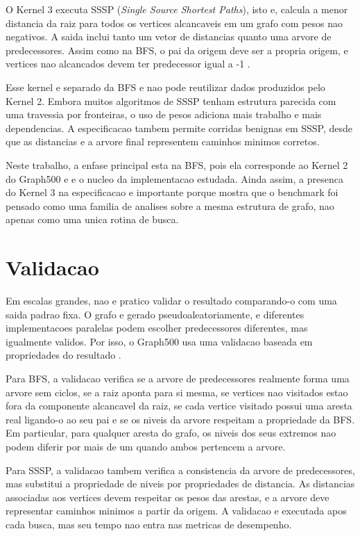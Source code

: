 O Kernel 3 executa SSSP (\textit{Single Source Shortest Paths}), isto e, calcula
a menor distancia da raiz para todos os vertices alcancaveis em um grafo com
pesos nao negativos. A saida inclui tanto um vetor de distancias quanto uma
arvore de predecessores. Assim como na BFS, o pai da origem deve ser a propria
origem, e vertices nao alcancados devem ter predecessor igual a -1
\cite{graph500spec, cormenalgorithms}.

Esse kernel e separado da BFS e nao pode reutilizar dados produzidos pelo Kernel
2. Embora muitos algoritmos de SSSP tenham estrutura parecida com uma travessia
por fronteiras, o uso de pesos adiciona mais trabalho e mais dependencias. A
especificacao tambem permite corridas benignas em SSSP, desde que as distancias e
a arvore final representem caminhos minimos corretos.

Neste trabalho, a enfase principal esta na BFS, pois ela corresponde ao Kernel 2
do Graph500 e e o nucleo da implementacao estudada. Ainda assim, a presenca do
Kernel 3 na especificacao e importante porque mostra que o benchmark foi pensado
como uma familia de analises sobre a mesma estrutura de grafo, nao apenas como
uma unica rotina de busca.

\section{Validacao}

Em escalas grandes, nao e pratico validar o resultado comparando-o com uma saida
padrao fixa. O grafo e gerado pseudoaleatoriamente, e diferentes implementacoes
paralelas podem escolher predecessores diferentes, mas igualmente validos. Por
isso, o Graph500 usa uma validacao baseada em propriedades do resultado
\cite{graph500spec}.

Para BFS, a validacao verifica se a arvore de predecessores realmente forma uma
arvore sem ciclos, se a raiz aponta para si mesma, se vertices nao visitados estao
fora da componente alcancavel da raiz, se cada vertice visitado possui uma aresta
real ligando-o ao seu pai e se os niveis da arvore respeitam a propriedade da
BFS. Em particular, para qualquer aresta do grafo, os niveis dos seus extremos
nao podem diferir por mais de um quando ambos pertencem a arvore.

Para SSSP, a validacao tambem verifica a consistencia da arvore de predecessores,
mas substitui a propriedade de niveis por propriedades de distancia. As
distancias associadas aos vertices devem respeitar os pesos das arestas, e a
arvore deve representar caminhos minimos a partir da origem. A validacao e
executada apos cada busca, mas seu tempo nao entra nas metricas de desempenho.

